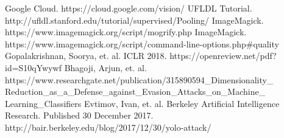 \documentclass[letterpaper, 10 pt, conference]{ieeeconf}  %
\begin{document}
\begin{thebibliography}{99}

  Google Cloud. https://cloud.google.com/vision/
  UFLDL Tutorial. http://ufldl.stanford.edu/tutorial/supervised/Pooling/
  ImageMagick. https://www.imagemagick.org/script/mogrify.php
  ImageMagick. https://www.imagemagick.org/script/command-line-options.php\#quality
 Gopalakrishnan, Soorya, et. al.  ICLR 2018. https://openreview.net/pdf?id=S10qYwywf
 Bhagoji, Arjun, et. al.  https://www.researchgate.net/publication/315890594\_Dimensionality\_ Reduction\_as\_a\_Defense\_against\_Evasion\_Attacks\_on\_Machine\_ Learning\_Classifiers 
 Evtimov, Ivan, et. al.  Berkeley Artificial Intelligence Research. Published 30 December 2017. http://bair.berkeley.edu/blog/2017/12/30/yolo-attack/

\end{thebibliography}
\end{document}

